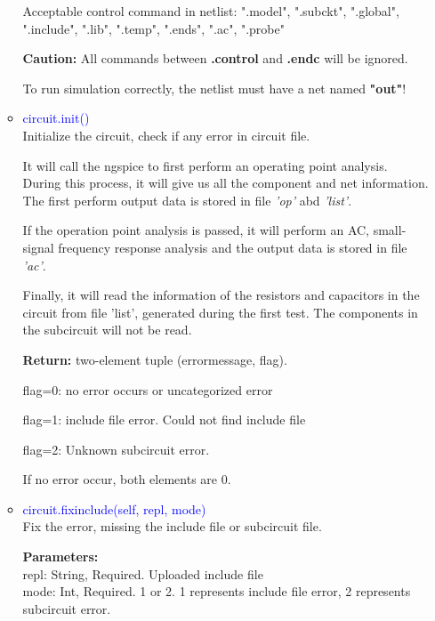 \documentclass[12pt,a4paper]{article}
\begin{document}
\begin{itemize}[leftmargin=*]
\begin{itemize}
                Acceptable control command in netlist: ".model", ".subckt", ".global", ".include", ".lib", ".temp", ".ends", ".ac", ".probe"

                \textbf{Caution:} All commands between \textbf{.control} and \textbf{.endc} will be ignored.

                To run simulation correctly, the netlist must have a net named \textbf{"out"}!

            \item \textcolor{blue}{circuit.init()}\\
                Initialize the circuit, check if any error in circuit file.

                It will call the ngspice to first perform an operating point analysis. During this process, it will give us all the component and net information. The first perform output data is stored in file \textit{'op'} abd \textit{'list'}.

                If the operation point analysis is passed, it will perform an AC, small-signal frequency response
                analysis and the output data is stored in file \textit{'ac'}.

                Finally, it will read the information of the resistors and capacitors in the circuit from file 'list', generated during the first test. The components in the subcircuit will not be read.

                \textbf{Return:} two-element tuple (error\textunderscore message, flag).

                flag=0: no error occurs or uncategorized error

                flag=1: include file error. Could not find include file

                flag=2: Unknown subcircuit error.

                If no error occur, both elements are 0.

            \item \textcolor{blue}{circuit.fixinclude(self, repl, mode)}\\
                Fix the error, missing the include file or subcircuit file.

                \textbf{Parameters:}\\
                repl: String, Required. Uploaded include file\\
                mode: Int, Required. 1 or 2. 1 represents include file error, 2 represents subcircuit error.


\end{itemize}
\end{itemize}
\end{document}
